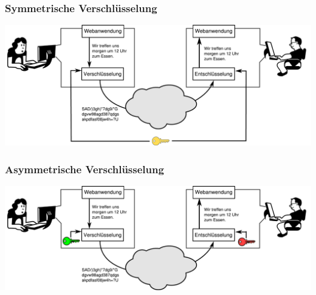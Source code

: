 \documentclass[12pt]{beamer}
\begin{document}
\begin{frame}
    \frametitle{Symmetrische Verschlüsselung}
    \begin{center}
	\includegraphics[width=\textwidth]{img/krypto_symmetric.pdf}
    \end{center}	
\end{frame}

\begin{frame}
    \frametitle{Asymmetrische Verschlüsselung}
    \begin{center}
	\includegraphics[width=\textwidth]{img/krypto_asymmetric.pdf}
    \end{center}	
\end{frame}

\end{document}
